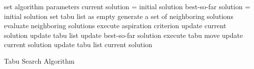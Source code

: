\setlength{\textfloatsep}{0.2cm}
\begin{algorithm2e}[htb]
	set algorithm parameters\;
	current solution = initial solution\;
	best-so-far solution = initial solution\;
	set tabu list as empty\;
	{
		generate a set of neighboring solutions\;
		evaluate neighboring solutions\;
		{
			execute aspiration criterion\;
			update current solution\;
			update tabu list\;
			update best-so-far solution\;
		}
		{
			execute tabu move\;
			update current solution\;
			update tabu list\;
		}
	}
	\Return current solution\;
	\caption{Tabu Search Algorithm}
	\label{algo:tabu_search}
\end{algorithm2e}
\setlength{\floatsep}{0.2cm}